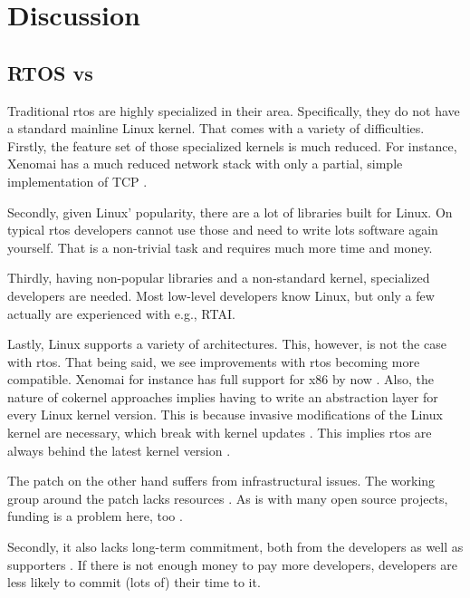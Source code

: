 \documentclass[10pt,twocolumn,a4paper]{article}
\begin{document}
\section{Discussion}
\subsection{RTOS vs }
Traditional \acrshort{rtos} are highly specialized in their area.
Specifically, they do not have a standard mainline Linux kernel.
That comes with a variety of difficulties.
Firstly, the feature set of those specialized kernels is much reduced.
For instance, Xenomai has a much reduced network stack with only a partial, simple implementation of TCP \cite{xenomai_network_2024}.

Secondly, given Linux' popularity, there are a lot of libraries built for Linux.
On typical \acrshort{rtos} developers cannot use those and need to write lots software again yourself.
That is a non-trivial task and requires much more time and money.

Thirdly, having non-popular libraries and a non-standard kernel, specialized developers are needed.
Most low-level developers know Linux, but only a few actually are experienced with e.g., RTAI.

Lastly, Linux supports a variety of architectures.
This, however, is not the case with \acrshort{rtos}.
That being said, we see improvements with \acrshort{rtos} becoming more compatible.
Xenomai for instance has full support for x86 by now \cite{xenomai_supported}.
Also, the nature of cokernel approaches implies having to write an abstraction layer for every Linux kernel version.
This is because invasive modifications of the Linux kernel are necessary, which break with kernel updates \cite{reghenzani_realtime_2019}.
This implies \acrshort{rtos} are always behind the latest kernel version \cite{xenomai_versions}.
\newline

\noindent The  patch on the other hand suffers from infrastructural issues.
The working group around the patch lacks resources \cite{perlow_trenches_2021}.
As is with many open source projects, funding is a problem here, too \cite{perlow_trenches_2021}.

Secondly, it also lacks long-term commitment, both from the developers as well as supporters \cite{perlow_trenches_2021}.
If there is not enough money to pay more developers, developers are less likely to commit (lots of) their time to it.
\end{document}
